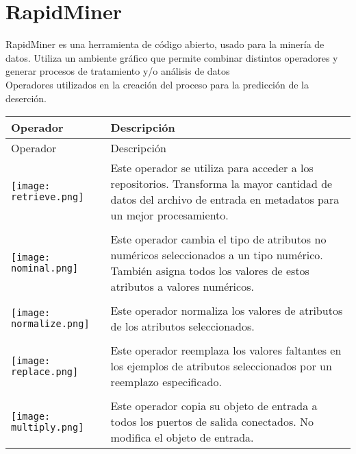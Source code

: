 \chapter{RapidMiner}
\label{ch:anexo-b}
\newpage

RapidMiner es una herramienta de código abierto, usado para la minería de datos. Utiliza un ambiente gráfico que permite combinar distintos operadores y generar procesos de tratamiento y/o análisis de datos\\

Operadores utilizados en la creación del proceso para la predicción de la deserción.\\

\begin{longtable}{>{\centering\arraybackslash}m{3cm} >{\centering\arraybackslash}m{8cm}}
		\hline
		Operador & Descripción \\
		\hline \hline
		\endfirsthead
		
		\hline
		Operador & Descripción \\
		\hline \hline
		\endhead
		
		 \texttt{[image: retrieve.png]} & Este operador se utiliza para acceder a los repositorios. Transforma la mayor cantidad de datos del archivo de entrada en metadatos para un mejor procesamiento. \\	\hline \\
		
	     \texttt{[image: nominal.png]} & Este operador cambia el tipo de atributos no numéricos seleccionados a un tipo numérico. También asigna todos los valores de estos atributos a valores numéricos. \\	\hline \\
		
	     \texttt{[image: normalize.png]} &  Este operador normaliza los valores de atributos de los atributos seleccionados.\\	\hline \\
		
	     \texttt{[image: replace.png]} & Este operador reemplaza los valores faltantes en los ejemplos de atributos seleccionados por un reemplazo especificado. \\ \hline \\
		
	     \texttt{[image: multiply.png]} & Este operador copia su objeto de entrada a todos los puertos de salida conectados. No modifica el objeto de entrada. \\	\hline
		

\end{longtable}
